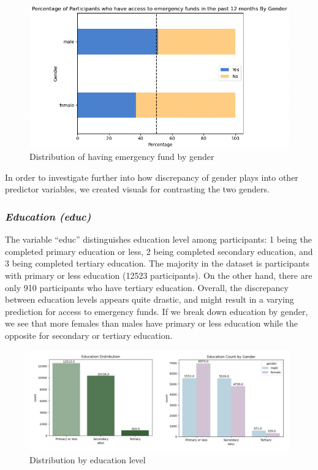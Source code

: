 \documentclass[12pt]{article}
\begin{document}
\begin{figure}

{\centering \includegraphics[width=1\linewidth]{graphs/f24_graph3} 

}

\caption{Distribution of having emergency fund by gender}\label{fig:unnamed-chunk-6}
\end{figure}

In order to investigate further into how discrepancy of gender plays
into other predictor variables, we created visuals for contrasting the
two genders.

\hypertarget{education-educ}{%
\subsubsection{\texorpdfstring{\emph{Education
(educ)}}{Education (educ)}}\label{education-educ}}

The variable ``educ'' distinguishes education level among participants:
1 being the completed primary education or less, 2 being completed
secondary education, and 3 being completed tertiary education. The
majority in the dataset is participants with primary or less education
(12523 participants). On the other hand, there are only 910 participants
who have tertiary education. Overall, the discrepancy between education
levels appears quite drastic, and might result in a varying prediction
for access to emergency funds. If we break down education by gender, we
see that more females than males have primary or less education while
the opposite for secondary or tertiary education.

\begin{figure}

{\centering \includegraphics[width=1\linewidth]{graphs/f24_graph4} 

}

\caption{Distribution by education level}\label{fig:unnamed-chunk-7}
\end{figure}
\end{document}
